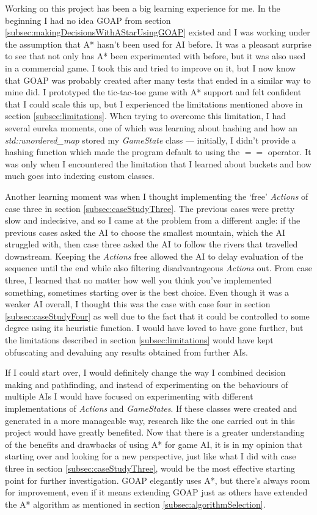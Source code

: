 \documentclass[11pt, a4paper]{report}
\begin{document}
Working on this project has been a big learning experience for me. In the beginning I had no idea GOAP from section \ref{subsec:makingDecisionsWithAStarUsingGOAP} existed and I was working under the assumption that A* hasn't been used for AI before. It was a pleasant surprise to see that not only has A* been experimented with before, but it was also used in a commercial game. I took this and tried to improve on it, but I now know that GOAP was probably created after many tests that ended in a similar way to mine did. I prototyped the tic-tac-toe game with A* support and felt confident that I could scale this up, but I experienced the limitations mentioned above in section \ref{subsec:limitations}. When trying to overcome this limitation, I had several eureka moments, one of which was learning about hashing and how an \emph{std::unordered\_map} stored my \emph{GameState} class --- initially, I didn't provide a hashing function which made the program default to using the $==$ operator. It was only when I encountered the limitation that I learned about buckets and how much goes into indexing custom classes. 

Another learning moment was when I thought implementing the `free' \emph{Actions} of case three in section \ref{subsec:caseStudyThree}. The previous cases were pretty slow and indecisive, and so I came at the problem from a different angle: if the previous cases asked the AI to choose the smallest mountain, which the AI struggled with, then case three asked the AI to follow the rivers that travelled downstream. Keeping the \emph{Actions} free allowed the AI to delay evaluation of the sequence until the end while also filtering disadvantageous \emph{Actions} out. From case three, I learned that no matter how well you think you've implemented something, sometimes starting over is the best choice. Even though it was a weaker AI overall, I thought this was the case with case four in section \ref{subsec:caseStudyFour} as well due to the fact that it could be controlled to some degree using its heuristic function. I would have loved to have gone further, but the limitations described in section \ref{subsec:limitations} would have kept obfuscating and devaluing any results obtained from further AIs. 

If I could start over, I would definitely change the way I combined decision making and pathfinding, and instead of experimenting on the behaviours of multiple AIs I would have focused on experimenting with different implementations of \emph{Actions} and \emph{GameStates}. If these classes were created and generated in a more manageable way, research like the one carried out in this project would have greatly benefited. Now that there is a greater understanding of the benefits and drawbacks of using A* for game AI, it is in my opinion that starting over and looking for a new perspective, just like what I did with case three in section \ref{subsec:caseStudyThree}, would be the most effective starting point for further investigation. GOAP elegantly uses A*, but there's always room for improvement, even if it means extending GOAP just as others have extended the A* algorithm as mentioned in section \ref{subsec:algorithmSelection}.
\end{document}
